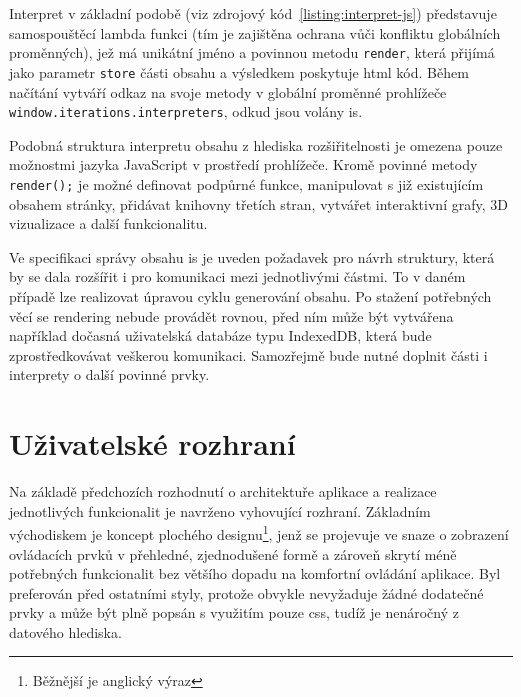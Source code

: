 Interpret v základní podobě (viz zdrojový kód~\ref{listing:interpret-js}) představuje samospouštěcí lambda funkci (tím je zajištěna ochrana vůči konfliktu globálních proměnných), jež má unikátní jméno a povinnou metodu \texttt{render}, která přijímá jako parametr \texttt{store} části obsahu a výsledkem poskytuje \gls{html} kód. Během načítání vytváří odkaz na svoje metody v globální proměnné prohlížeče \texttt{window.iterations.interpreters}, odkud jsou volány \gls{is}.

Podobná struktura interpretu obsahu z hlediska rozšiřitelnosti je omezena pouze možnostmi jazyka JavaScript v prostředí prohlížeče. Kromě povinné metody \texttt{render();} je možné definovat podpůrné funkce, manipulovat s již existujícím obsahem stránky, přidávat knihovny třetích stran, vytvářet interaktivní grafy, 3D vizualizace a další funkcionalitu.
\newpage

Ve specifikaci správy obsahu \gls{is} je uveden požadavek pro návrh struktury, která by se dala rozšířit i pro komunikaci mezi jednotlivými částmi. To v daném případě lze realizovat úpravou cyklu generování obsahu. Po stažení potřebných věcí se rendering nebude provádět rovnou, před ním může být vytvářena například dočasná uživatelská databáze typu IndexedDB, která bude zprostředkovávat veškerou komunikaci. Samozřejmě bude nutné doplnit části i interprety o další povinné prvky.



\section{Uživatelské rozhraní}

Na základě předchozích rozhodnutí o architektuře aplikace a realizace jednotlivých funkcionalit je navrženo vyhovující rozhraní. Základním východiskem je koncept plochého designu\footnote{Běžnější je anglický výraz }, jenž se projevuje ve snaze o zobrazení ovládacích prvků v přehledné, zjednodušené formě a zároveň skrytí méně potřebných funkcionalit bez většího dopadu na komfortní ovládání aplikace. Byl preferován před ostatními styly, protože obvykle nevyžaduje žádné dodatečné prvky a může být plně popsán s využitím pouze \gls{css}, tudíž je nenáročný z datového hlediska.

